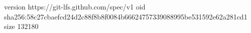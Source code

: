 version https://git-lfs.github.com/spec/v1
oid sha256:58c27cbaefcd24d2c88f8b8f0084b66624757339088995be531592e62a281cd1
size 132180
